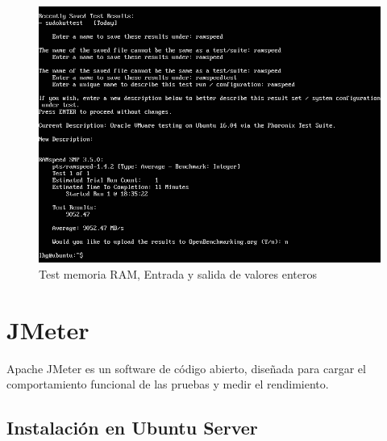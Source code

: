 \documentclass[12pt,a4paper]{article}
\begin{document}
	\begin{figure}[h]
		\centering
		\includegraphics[width=1.0\textwidth]{images/ramspeed-ubuntu-test.png}
		\caption{Test memoria RAM, Entrada y salida de valores enteros}
	\end{figure}

	\newpage
	\section{JMeter}
	Apache JMeter es un software de código abierto, diseñada para cargar el comportamiento funcional de las pruebas y medir el rendimiento.
	
	\subsection{Instalación en Ubuntu Server}
	
\end{document}
